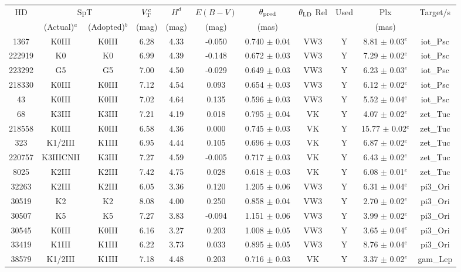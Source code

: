 \begin{tabular}{ccccccccccc}
\hline
HD & \multicolumn{2}{c}{SpT} & $V_{\rm T}^c$ & $H^d$ & $E(B-V)$ & $\theta_{\rm pred}$ & $\theta_{\rm LD}$ Rel & Used & Plx & Target/s \\
 & (Actual)$^a$ & (Adopted)$^b$ & (mag) & (mag) & (mag) & (mas) &  &  & (mas) &  \\
\hline
1367 & K0III & K0III & 6.28 & 4.33 & -0.050 & 0.740 $\pm$ 0.04 & VW3 & Y & 8.81 $\pm$ 0.03$^e$ &iot_Psc\\
222919 & K0 & K0 & 6.99 & 4.39 & -0.148 & 0.672 $\pm$ 0.03 & VW3 & Y & 7.29 $\pm$ 0.02$^e$ &iot_Psc\\
223292 & G5 & G5 & 7.00 & 4.50 & -0.029 & 0.649 $\pm$ 0.03 & VW3 & Y & 6.23 $\pm$ 0.03$^e$ &iot_Psc\\
218330 & K0III & K0III & 7.12 & 4.54 & 0.093 & 0.654 $\pm$ 0.03 & VW3 & Y & 6.12 $\pm$ 0.02$^e$ &iot_Psc\\
43 & K0III & K0III & 7.02 & 4.64 & 0.135 & 0.596 $\pm$ 0.03 & VW3 & Y & 5.52 $\pm$ 0.04$^e$ &iot_Psc\\
68 & K3III & K3III & 7.21 & 4.19 & 0.018 & 0.795 $\pm$ 0.04 & VK & Y & 4.07 $\pm$ 0.02$^e$ &zet_Tuc\\
218558 & K0III & K0III & 6.58 & 4.36 & 0.000 & 0.745 $\pm$ 0.03 & VK & Y & 15.77 $\pm$ 0.02$^e$ &zet_Tuc\\
323 & K1/2III & K1III & 6.95 & 4.44 & 0.105 & 0.696 $\pm$ 0.03 & VK & Y & 6.87 $\pm$ 0.02$^e$ &zet_Tuc\\
220757 & K3IIICNII & K3III & 7.27 & 4.59 & -0.005 & 0.717 $\pm$ 0.03 & VK & Y & 6.43 $\pm$ 0.02$^e$ &zet_Tuc\\
8025 & K2III & K2III & 7.42 & 4.75 & 0.028 & 0.618 $\pm$ 0.03 & VK & Y & 6.08 $\pm$ 0.01$^e$ &zet_Tuc\\
32263 & K2III & K2III & 6.05 & 3.36 & 0.120 & 1.205 $\pm$ 0.06 & VW3 & Y & 6.31 $\pm$ 0.04$^e$ &pi3_Ori\\
30519 & K2 & K2 & 8.08 & 4.00 & 0.250 & 0.858 $\pm$ 0.04 & VW3 & Y & 2.70 $\pm$ 0.02$^e$ &pi3_Ori\\
30507 & K5 & K5 & 7.27 & 3.83 & -0.094 & 1.151 $\pm$ 0.06 & VW3 & Y & 3.99 $\pm$ 0.02$^e$ &pi3_Ori\\
30545 & K0III & K0III & 6.16 & 3.27 & 0.203 & 1.008 $\pm$ 0.05 & VW3 & Y & 3.65 $\pm$ 0.04$^e$ &pi3_Ori\\
33419 & K1III & K1III & 6.22 & 3.73 & 0.033 & 0.895 $\pm$ 0.05 & VW3 & Y & 8.76 $\pm$ 0.04$^e$ &pi3_Ori\\
38579 & K1/2III & K1III & 7.18 & 4.48 & 0.203 & 0.716 $\pm$ 0.03 & VK & Y & 3.37 $\pm$ 0.02$^e$ &gam_Lep\\

\end{tabular}
